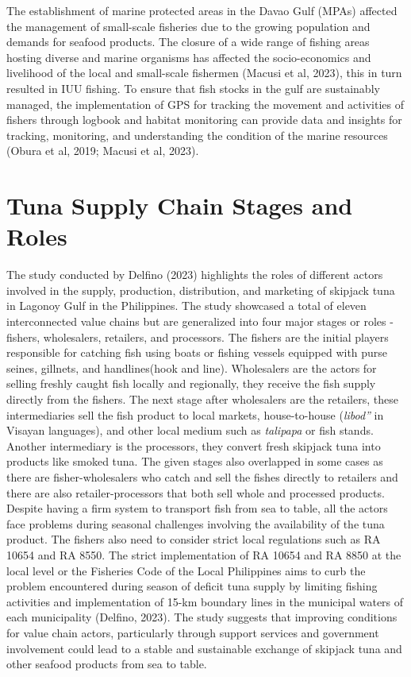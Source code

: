 The establishment of marine protected areas in the Davao Gulf (MPAs) affected the management of small-scale fisheries due to the growing population and demands for seafood products. The closure of a wide range of fishing areas hosting diverse and marine organisms has affected the socio-economics and livelihood of the local and small-scale fishermen (Macusi et al, 2023), this in turn resulted in IUU fishing.  To ensure that fish stocks in the gulf are sustainably managed, the implementation of GPS for tracking the movement and activities of fishers through logbook and habitat monitoring can provide data and insights for tracking, monitoring, and understanding the condition of the marine resources (Obura et al, 2019; Macusi et al, 2023).

\section{Tuna Supply Chain Stages and Roles} 

The study conducted by Delfino (2023) highlights the roles of different actors involved in the supply, production, distribution, and marketing of skipjack tuna in Lagonoy Gulf in the Philippines. The study showcased a total of eleven interconnected value chains but are generalized into four major stages or roles - fishers, wholesalers, retailers, and processors. The fishers are the initial players responsible for catching fish using boats or fishing vessels equipped with purse seines, gillnets, and handlines(hook and line). Wholesalers are the actors for selling freshly caught fish locally and regionally, they receive the fish supply directly from the fishers. The next stage after wholesalers are the retailers, these intermediaries sell the fish product to local markets, house-to-house (\textit{libod”} in Visayan languages), and other local medium such as \textit{talipapa} or fish stands. Another intermediary is the processors, they convert fresh skipjack tuna into products like smoked tuna. The given stages also overlapped in some cases as there are fisher-wholesalers who catch and sell the fishes directly to retailers and there are also retailer-processors that both sell whole and processed products. Despite having a firm system to transport fish from sea to table, all the actors face problems during seasonal challenges involving the availability of the tuna product. The fishers also need to consider strict local regulations such as RA 10654 and RA 8550. The strict implementation of RA 10654 and RA 8850 at the local level or the Fisheries Code of the Local Philippines aims to curb the problem encountered during season of deficit tuna supply by limiting fishing activities and implementation of 15-km boundary lines in the municipal waters of each municipality (Delfino, 2023). The study suggests that improving conditions for value chain actors, particularly through support services and government involvement could lead to a stable and sustainable exchange of skipjack tuna and other seafood products from sea to table.

